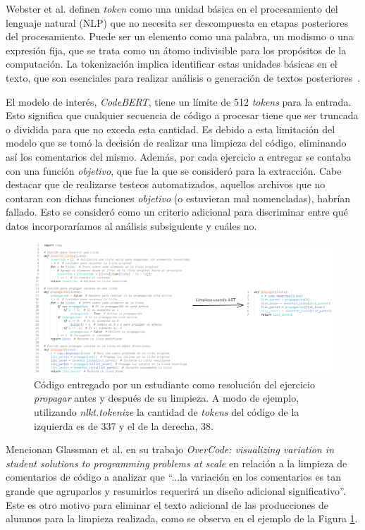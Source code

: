 \documentclass[11pt,a4paper,twoside,openany]{tesis}
\begin{document}
Webster et al. definen \emph{token} como una unidad básica en el procesamiento del lenguaje natural (NLP) que no necesita ser descompuesta en etapas posteriores del procesamiento. Puede ser un elemento como una palabra, un modismo o una expresión fija, que se trata como un átomo indivisible para los propósitos de la computación. La tokenización implica identificar estas unidades básicas en el texto, que son esenciales para realizar análisis o generación de textos posteriores~\cite{tokens}.

El modelo de interés, \emph{CodeBERT}, tiene un límite de 512 \emph{tokens} para la entrada. Esto significa que cualquier secuencia de código a procesar tiene que ser truncada o dividida para que no exceda esta cantidad. Es debido a esta limitación del modelo que se tomó la decisión de realizar una limpieza del código, eliminando así los comentarios del mismo. Además, por cada ejercicio a entregar se contaba con una función \emph{objetivo}, que fue la que se consideró para la extracción. Cabe destacar que de realizarse testeos automatizados, aquellos archivos que no contaran con dichas funciones \emph{objetivo} (o estuvieran mal nomencladas), habrían fallado. Esto se consideró como un criterio adicional para discriminar entre qué datos incorporaríamos al análisis subsiguiente y cuáles no. 

\begin{figure}[H]
    \centering
    \includegraphics[width=1\textwidth]{imagenes/ast.PNG}
    \caption{Código entregado por un estudiante como resolución del ejercicio \emph{propagar} antes y después de su limpieza. A modo de ejemplo, utilizando \emph{nlkt.tokenize} la cantidad de \emph{tokens} del código de la izquierda es de 337 y el de la derecha, 38.}
      \label{limpieza}
\end{figure}

Mencionan Glassman et al. en su trabajo \emph{OverCode: visualizing variation in student solutions to programming problems at scale} \cite{overcode} en relación a la limpieza de comentarios de código a analizar que ``...la variación en los comentarios es tan grande que agruparlos y resumirlos requerirá un diseño adicional significativo''. Este es otro motivo para eliminar el texto adicional de las producciones de alumnos para la limpieza realizada, como se observa en el ejemplo de la Figura \ref{limpieza}.
\end{document}
